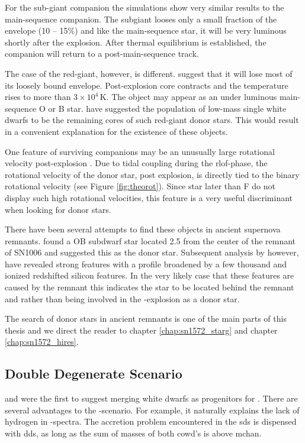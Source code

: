 For the sub-giant companion the simulations show very similar results to the main-sequence companion. The subgiant looses only a small fraction of the envelope (10 -- 15\%) and like the main-sequence star, it will be very luminous shortly after the explosion. After thermal equilibrium is established, the companion will return to a post-main-sequence track. 

The case of the red-giant, however, is different. \citet{2000ApJS..128..615M} suggest that it will lose most of its loosely bound envelope. Post-explosion core contracts and the temperature rises to more than $3 \times 10^4$\,K. The object may appear as an under luminous main-sequence O or B star. \cite{2009A&A...493.1081J} have suggested the population of low-mass single white dwarfs to be the remaining cores of such red-giant donor stars. This would result in a convenient explanation for the existence of these objects. 

One feature of surviving companions may be an unusually large rotational velocity post-explosion \citep[][chapter \ref{chap:sn1572_starg} of this work]{2009ApJ...701.1665K}. Due to tidal coupling during the \gls{rlof}-phase, the rotational velocity  of the donor star, post explosion, is directly tied to the binary rotational velocity (see Figure \ref{fig:theorot}). Since star later than F do not display such high rotational velocities, this feature is a very useful discriminant when looking for donor stars. 

There have been several attempts to find these objects in ancient supernova remnants. \citet{1980ApJ...241.1039S} found a OB subdwarf star located 2.5 \arcmin from the center of the remnant of SN1006 and suggested this as the donor star. Subsequent analysis by \cite{1997ApJ...477L..53W, 1983ApJ...269L...5W} however, have revealed strong  features with a profile broadened by a few thousand \kms and ionized redshifted silicon features. In the very likely case that these features are caused by the remnant this indicates the star to be located behind the remnant and rather than being involved in the \snia-explosion as a donor star.
 
The search of donor stars in ancient remnants is one of the main parts of this thesis and we direct the reader to chapter \ref{chap:sn1572_starg} and chapter \ref{chap:sn1572_hires}.



\subsection{Double Degenerate Scenario}
\citet{1984ApJ...277..355W} and \citet{1984ApJS...54..335I} were the first to suggest merging white dwarfs as progenitors for \snia. There are several advantages to the \dd-scenario. For example, it naturally explains the lack of hydrogen in \snia-spectra. The accretion problem encountered in the \gls{sds} is dispensed with \gls{dds}, as long as the sum of masses of both \gls{cowd}'s is above \gls{mchan}. 

